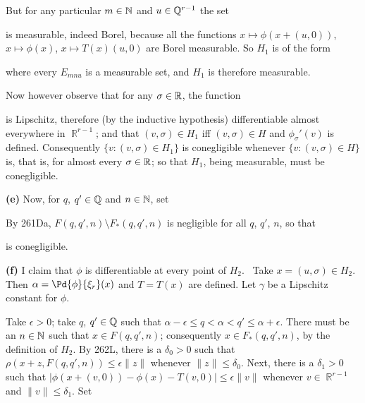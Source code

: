{\noindent But for any particular $m\in\Bbb N$ and $u\in\Bbb Q^{r-1}$ the
set


\noindent is measurable, indeed Borel, because all the functions
$x\mapsto\phi(x+(u,0))$, $x\mapsto\phi(x)$, $x\mapsto T(x)(u,0)$ are
Borel measurable.   So $H_1$ is of the form


\noindent where every $E_{mnu}$ is a measurable set, and $H_1$ is
therefore measurable.

Now however observe that for any $\sigma\in\Bbb R$, the function


\noindent is Lipschitz, therefore (by the inductive hypothesis)
differentiable almost everywhere in $\BbbR^{r-1}$;  and that
$(v,\sigma)\in H_1$ iff $(v,\sigma)\in H$ and $\phi_{\sigma}'(v)$ is
defined.   Consequently
$\{v:(v,\sigma)\in H_1\}$ is conegligible whenever
$\{v:(v,\sigma)\in H\}$
is, that is, for almost every $\sigma\in \Bbb R$;  so that $H_1$, being
measurable, must be conegligible.\ \Qed

\medskip

{\bf (e)} Now, for $q$, $q'\in\Bbb Q$ and $n\in\Bbb N$, set



\noindent By 261Da, $F(q,q',n)\setminus F_*(q,q',n)$ is negligible for
all $q$, $q'$, $n$, so that


\noindent is conegligible.

\medskip

{\bf (f)} I claim that $\phi$ is differentiable at every point of $H_2$.
\Prf\ Take $x=(u,\sigma)\in H_2$.   Then $\alpha=\Pd{\phi}{\xi_r}(x)$
and $T=T(x)$ are defined.   Let $\gamma$ be a Lipschitz constant for
$\phi$.

Take $\epsilon>0$;  take $q$, $q'\in\Bbb Q$ such that
$\alpha-\epsilon\le q<\alpha<q'\le\alpha+\epsilon$.   There must be an
$n\in\Bbb N$ such that $x\in F(q,q',n)$;  consequently
$x\in F_*(q,q',n)$,
by the definition of $H_2$.   By 262L, there is a $\delta_0>0$ such that
$\rho(x+z,F(q,q',n))\le\epsilon\|z\|$ whenever $\|z\|\le\delta_0$.
Next, there is a $\delta_1>0$ such that
$|\phi(x+(v,0))-\phi(x)-T(v,0)|\le\epsilon\|v\|$ whenever
$v\in\BbbR^{r-1}$ and $\|v\|\le\delta_1$.   Set

}
